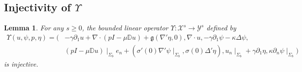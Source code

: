 \documentclass[11pt,letterpaper,reqno]{amsart}
\newtheorem{lemma}[theorem]{Lemma}
\numberwithin{equation}{section}
\begin{document}
\subsection{Injectivity of \(\Upsilon\)} \label{injectivity}
\begin{lemma}
    For any \(s \geq 0\), the bounded linear operator \(\Upsilon:\mathcal{X}^{s} \to \mathcal{Y}^{s}\) defined by
    \begin{align}
        \Upsilon(u,\psi,p,\eta)=\biggl(&-\gamma\partial_{1}u+\nabla \cdot (pI-\mu\mathbb{D}u)+\mathfrak{g}(\nabla'\eta,0),\nabla \cdot u, -\gamma\partial_{1}\psi-\kappa\Delta\psi,   \nonumber \\
        &(pI-\mu\mathbb{D}u)\mid_{\Sigma_{b}}e_{n}+(\sigma'(0)\nabla'\psi\mid_{\Sigma_{b}},\sigma(0)\Delta'\eta),u_{n}\mid_{\Sigma_{b}}+\gamma\partial_{1}\eta,\kappa\partial_{n}\psi \mid_{\Sigma_{b}}\biggr) \label{upsilondef}
    \end{align}
    is injective.
\end{lemma}
\end{document}
